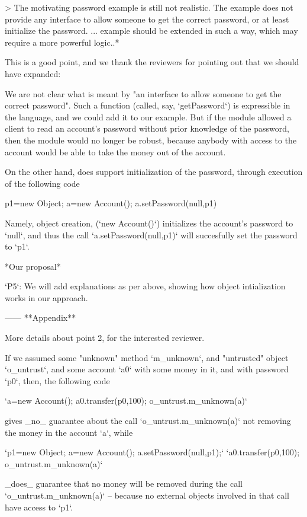 \documentclass[11pt]{amsart}
\begin{document}
> The motivating password example is still not realistic. The example does not 
provide any interface to allow someone to get the correct password, or at 
least initialize the password. ... example should be extended in such a way, 
which may require a more powerful logic..*

This is a good point, and we thank the reviewers for pointing out that we should
have expanded:

We are not clear what is meant by "an interface to allow someone to get the 
correct password". Such a function (called, say, `getPassword`) is expressible
in the language, and we could add it to our example. But if the module allowed 
a client to read an account's password without prior knowledge of the password, 
then the module would no longer be robust, because anybody with access to
the account would be able to take the money out of the account. 

On the other hand, \ModC does support initialization of the password, through
execution of the following code

	p1=new Object; a=new Account(); a.setPassword(null,p1)

Namely, object creation, (`new Account()`) initializes the account's password
to `null`, and thus the call `a.setPassword(null,p1)` will succesfully set the password
to `p1`. 

*Our proposal* 

`P5`: We will add explanations as per above, showing how object intialization works 
in our approach. 

------
**Appendix**

More details about point 2, for the interested reviewer.

If we assumed some "unknown" method `m\_unknown`, and "untrusted" 
object `o\_untrust`, and some account `a0` with some money in it, and with password
`p0`, then, the following code

         `a=new Account(); a0.transfer(p0,100); o\_untrust.m\_unknown(a)`

gives \_no\_ guarantee about the call `o\_untrust.m\_unknown(a)` not removing the money in the account `a`, while

        `p1=new Object; a=new Account();  a.setPassword(null,p1);`
        `a0.transfer(p0,100);  o\_untrust.m\_unknown(a)`

\_does\_ guarantee that no money will be removed during the call `o\_untrust.m\_unknown(a)`
-- because no external objects involved in that call have access to `p1`.  
\end{document}
